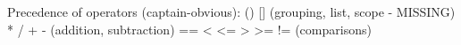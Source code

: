 Precedence of  operators (captain-obvious):
() [] {} (grouping, list, scope - MISSING)
* / %
+ - (addition, subtraction)
== < <= > >= != (comparisons)
